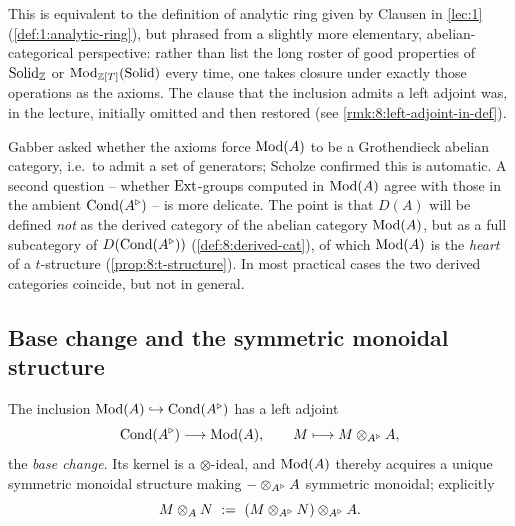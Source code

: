 \begin{remark}
\label{rmk:8:equivalent-L1}
This is equivalent to the definition of analytic ring given by Clausen in
\cref{lec:1} (\cref{def:1:analytic-ring}), but phrased from a slightly more
elementary, abelian-categorical perspective: rather than list the long roster of
good properties of $\mathrm{Solid}_{\mathbb{Z}}$ or $\operatorname{Mod}_{\mathbb{Z}[T]}(\mathrm{Solid})$ every
time, one takes closure under exactly those operations as the axioms. The clause
that the inclusion admits a left adjoint was, in the lecture, initially omitted
and then restored (see \cref{rmk:8:left-adjoint-in-def}).
\end{remark}

\begin{remark}
\label{rmk:8:grothendieck-heart}
Gabber asked whether the axioms force $\operatorname{Mod}(A)$ to be a Grothendieck abelian
category, i.e.\ to admit a set of generators; Scholze confirmed this is automatic.
A second question -- whether $\operatorname{Ext}$-groups computed in $\operatorname{Mod}(A)$ agree with those
in the ambient $\operatorname{Cond}(A^{\triangleright})$ -- is more delicate. The point is that $D(A)$ will
be defined \emph{not} as the derived category of the abelian category $\operatorname{Mod}(A)$,
but as a full subcategory of $D(\operatorname{Cond}(A^{\triangleright}))$ (\cref{def:8:derived-cat}), of which
$\operatorname{Mod}(A)$ is the \emph{heart} of a $t$-structure (\cref{prop:8:t-structure}). In
most practical cases the two derived categories coincide, but not in general.
\end{remark}

\subsection{Base change and the symmetric monoidal structure}

\begin{proposition}
\label{prop:8:base-change}
The inclusion $\operatorname{Mod}(A)\hookrightarrow\operatorname{Cond}(A^{\triangleright})$ has a left adjoint
\begin{equation*}
\operatorname{Cond}(A^{\triangleright})\longrightarrow\operatorname{Mod}(A),\qquad M\longmapsto M\otimes_{A^{\triangleright}}A,
\end{equation*}
the \emph{base change}. Its kernel is a $\otimes$-ideal, and $\operatorname{Mod}(A)$ thereby
acquires a unique symmetric monoidal structure making $-\otimes_{A^{\triangleright}}A$
symmetric monoidal; explicitly
\begin{equation}
\label{eq:8:tensor-A}
M\otimes_{A}N\ :=\ (M\otimes_{A^{\triangleright}}N)\otimes_{A^{\triangleright}}A .
\end{equation}
\end{proposition}

